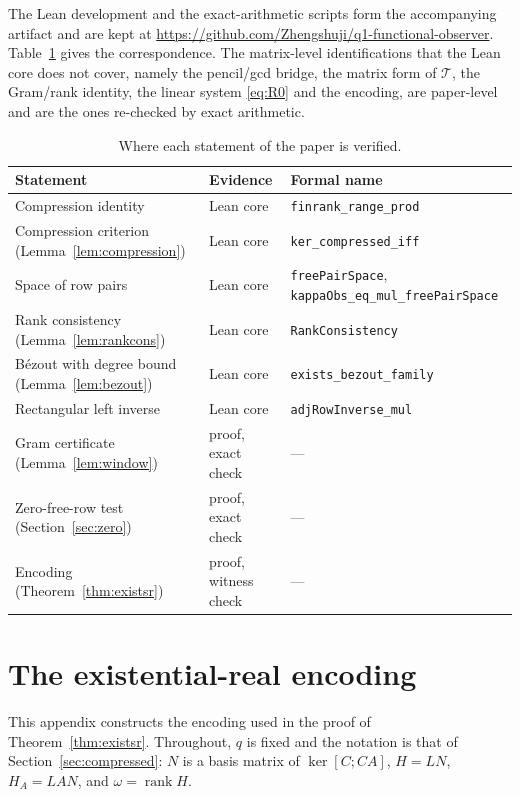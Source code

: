 The Lean development and the exact-arithmetic scripts form the accompanying artifact and are kept at \url{https://github.com/Zhengshuji/q1-functional-observer}. Table~\ref{tab:evidence} gives the correspondence. The matrix-level identifications that the Lean core does not cover, namely the pencil/gcd bridge, the matrix form of $\mathcal T$, the Gram/rank identity, the linear system \eqref{eq:R0} and the encoding, are paper-level and are the ones re-checked by exact arithmetic.

\begin{table}[!t]
\centering
\caption{Where each statement of the paper is verified.}\label{tab:evidence}
\small
\begin{tabular}{@{}lll@{}}
\toprule
Statement & Evidence & Formal name \\
\midrule
Compression identity & Lean core & \texttt{finrank\_range\_prod} \\
Compression criterion (Lemma~\ref{lem:compression}) & Lean core & \texttt{ker\_compressed\_iff} \\
Space of row pairs & Lean core & \texttt{freePairSpace},
\texttt{kappaObs\_eq\_mul\_freePairSpace} \\
Rank consistency (Lemma~\ref{lem:rankcons}) & Lean core & \texttt{RankConsistency} \\
B\'ezout with degree bound (Lemma~\ref{lem:bezout}) & Lean core & \texttt{exists\_bezout\_family} \\
Rectangular left inverse & Lean core & \texttt{adjRowInverse\_mul} \\
Gram certificate (Lemma~\ref{lem:window}) & proof, exact check & --- \\
Zero-free-row test (Section~\ref{sec:zero}) & proof, exact check & --- \\
Encoding (Theorem~\ref{thm:existsr}) & proof, witness check & --- \\
\bottomrule
\end{tabular}
\end{table}

\appendices
\section{The existential-real encoding}\label{app:encoding}

This appendix constructs the encoding used in the proof of Theorem~\ref{thm:existsr}. Throughout, $q$ is fixed and the notation is that of Section~\ref{sec:compressed}: $N$ is a basis matrix of $\ker[C;CA]$, $H=LN$, $H_A=LAN$, and $\omega=\operatorname{rank}H$.

